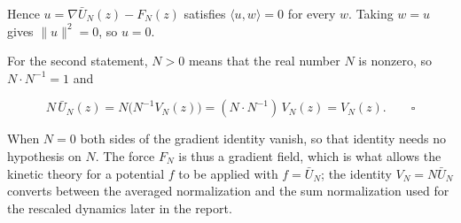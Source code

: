 \documentclass[11pt,a4paper]{report}
\begin{document}
Hence \(u=\nabla\bar U_N(z)-F_N(z)\) satisfies \(\langle u,w\rangle=0\) for every \(w\). Taking \(w=u\) gives \(\|u\|^2=0\), so \(u=0\).




For the second statement, \(N>0\) means that the real number \(N\) is nonzero, so \(N\cdot N^{-1}=1\) and


\[N\,\bar U_N(z)=N\bigl(N^{-1}V_N(z)\bigr)=(N\cdot N^{-1})\,V_N(z)=V_N(z).\qquad\square\]


When \(N=0\) both sides of the gradient identity vanish, so that identity needs no hypothesis on \(N\). The force \(F_N\) is thus a gradient field, which is what allows the kinetic theory for a potential \(f\) to be applied with \(f=\bar U_N\); the identity \(V_N=N\bar U_N\) converts between the averaged normalization and the sum normalization used for the rescaled dynamics later in the report.
\end{document}
